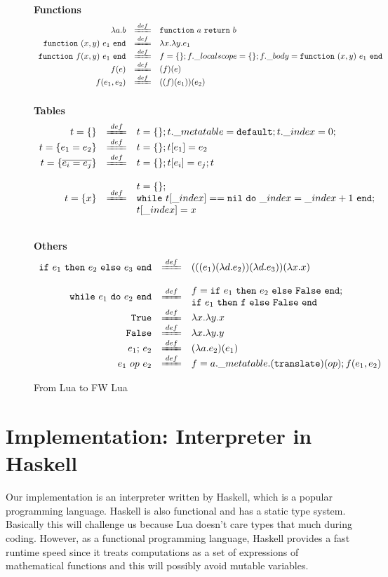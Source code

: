 \documentclass{article}
\begin{document}
\begin{figure}[P]
\caption{From Lua to FW Lua}
{\bf Functions}
\label{fig:Desugaring}
\[
\begin{array}{rclcl}
\desugar{
    \aFunction{a}{b}
}{
    {\tt function} ~a~ {\tt return} ~b~
}
\desugar{
    {\tt function}~(x,y)~e_1~{\tt end}
}{
    \aFunction{x}{\aFunction{y}{e_1}}
}
\desugar{
    {\tt function}~f(x,y)~e_1~{\tt end}
}{
    f = \{\}; f.\_localscope = \{\}; f.\_body = {\tt function}~(x,y)~e_1~{\tt end}
}
\desugar{f(e)}{(f)(e)}
\desugar{f(e_1,e_2)}{((f)(e_1))(e_2)}
\\
\end{array}
\]
{\bf Tables}
\label{fig:tables}
\[
\begin{array}{rclcl}
\desugar{
    t = \{\}
}{
   t = \{\}; t.\_metatable = {\tt default}; t.\_index = 0;\\
}
\desugar{
    t = \{e_1=e_2\}
}{
   t = \{\}; t[e_1] = e_2
}
\desugar{
    t = \{\overline{e_i = e_j}\}
}{
  t = \{\}; t[e_i]=e_j; t 
}
\\
\desugar{
    t = \{x\}
}{
   t = \{\};\\
   {\tt while}~t[\_index] == {\tt nil~do} ~ \_index = \_index + 1~ {\tt end};\\
   t[\_index] = x
   
}

\\
\end{array}
\]

{\bf Others}\[
\begin{array}{rclcl}
\desugar{
    {\tt if}~e_1~{\tt then}~e_2~{\tt else}~e_3~{\tt end}
}{
    (((e_1)(\aFunction{d}{e_2}))(\aFunction{d}{e_3}))(\aFunction{x}{x})
}
\\
\desugar{
    {\tt while}~e_1~{\tt do}~e_2~{\tt end}
}{
    f =  {\tt if}~e_1~{\tt then}~e_2~{\tt else}~{\tt False}~{\tt end};\\
    {\tt if}~e_1~{\tt then}~{\tt f}~{\tt else}~{\tt False}~{\tt end}
}
\desugar{\tt True}{\aFunction{x}{\aFunction{y}{x}}}
\desugar{\tt False}{\aFunction{x}{\aFunction{y}{y}}}
\desugar{e_1{\tt ;}~e_2}{(\aFunction{a}{e_2})(e_1)}
\desugar{
    e_1~ op ~e_2
}{
    f = a.\_metatable.({\tt translate})(op); f(e_1, e_2)
    
}
\end{array}\]


\end{figure}


\section{Implementation: Interpreter in Haskell}
Our implementation is an interpreter written by Haskell, which is a popular programming language. Haskell is also functional and has a static type system. Basically this will challenge us because Lua doesn't care types that much during coding. However, as a functional programming language, Haskell provides a fast runtime speed since it treats computations as a set of expressions of mathematical functions and this will possibly avoid mutable variables. 
\end{document}
